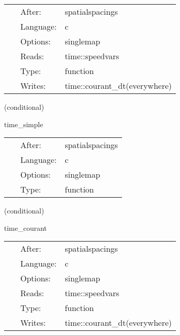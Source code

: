  \begin{tabular*}{160mm}{cll} 
~ & After:  & spatialspacings \\ 
~ & Language:  & c \\ 
~ & Options:  & singlemap \\ 
~ & Reads:  & time::speedvars \\ 
~ & Type:  & function \\ 
~ & Writes:  & time::courant\_dt(everywhere) \\ 
\end{tabular*} 


\vspace{5mm}

   (conditional) 

\hspace{5mm} time\_simple 

\hspace{5mm}{\it set timestep based on courant condition (courant\_time) } 


\hspace{5mm}

 \begin{tabular*}{160mm}{cll} 
~ & After:  & spatialspacings \\ 
~ & Language:  & c \\ 
~ & Options:  & singlemap \\ 
~ & Type:  & function \\ 
\end{tabular*} 


\vspace{5mm}

   (conditional) 

\hspace{5mm} time\_courant 

\hspace{5mm}{\it reset timestep each iteration } 


\hspace{5mm}

 \begin{tabular*}{160mm}{cll} 
~ & After:  & spatialspacings \\ 
~ & Language:  & c \\ 
~ & Options:  & singlemap \\ 
~ & Reads:  & time::speedvars \\ 
~ & Type:  & function \\ 
~ & Writes:  & time::courant\_dt(everywhere) \\ 
\end{tabular*} 


